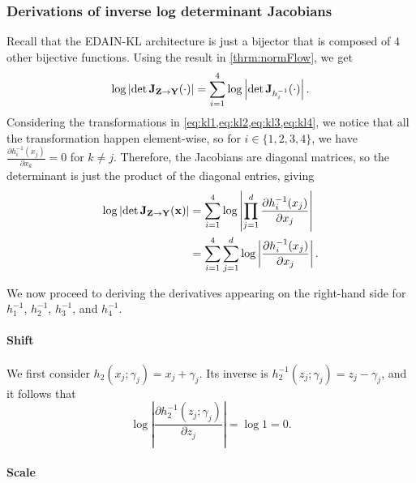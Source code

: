\documentclass{statsmsc}
\begin{document}
\subsubsection{Derivations of inverse log determinant Jacobians}%
\label{ssub:ildj}

Recall that the \ac{EDAIN-KL} architecture is just a bijector that is composed of 4 other bijective
functions. Using the result in \cref{thrm:normFlow}, we get
\begin{equation}
    \log \left|\det \mathbf{J}_{\mathbf{Z} \rightarrow {\mathbf{Y}}}(\cdot)  \right|
    = \sum^{4}_{i=1} \log \left|\det \mathbf{J}_{h_i^{-1}}(\cdot) \right|.
\end{equation}
Considering the transformations in \cref{eq:kl1,eq:kl2,eq:kl3,eq:kl4}, we notice that all the
transformation happen element-wise, so for $i\in\{1,2,3,4\}$, we have
$\frac{\partial h_i^{-1}(x_{j})}{\partial x_{k}} =0$ for $k \neq j$.
Therefore, the Jacobians are diagonal matrices, so the determinant is just the product of the
diagonal entries, giving
\begin{align}
    \log \left|\det \mathbf{J}_{\mathbf{Z} \rightarrow {\mathbf{Y}}}(\mathbf{x})  \right|
    & = \sum^{4}_{i=1} \log \left| \prod_{j=1}^d \frac{\partial h_i^{-1}(x_j)}{\partial x_j}   \right| \\
    & = \sum^{4}_{i=1} \sum_{j=1}^d \log \left| \frac{\partial h_i^{-1}(x_j)}{\partial x_j}   \right|.
\end{align}

We now proceed to deriving the derivatives appearing on the right-hand side for
$h_1^{-1}$, $h_2^{-1}$, $h_3^{-1}$, and $h_4^{-1}$.

\paragraph{Shift}%
\label{par:Shift}

We first consider $h_2(x_j;\gamma_j)=x_j+\gamma_j$. Its inverse is $h_2^{-1}(z_j;\gamma_j)=z_j-\gamma_j$, and it follows that
\begin{equation}
    \log \left|\frac{\partial h_2^{-1}(z_j ; \gamma_j)}{\partial z_j} \right|
    = \log 1 = 0.
\end{equation}

\paragraph{Scale}%
\label{par:Scale}
\end{document}

